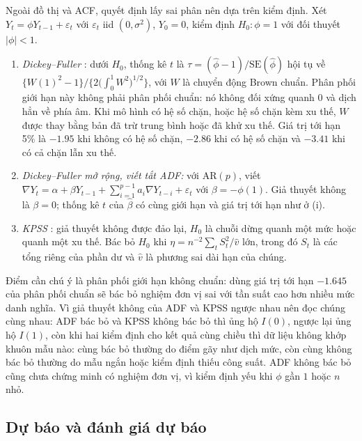 Ngoài đồ thị và ACF, quyết định lấy sai phân nên dựa trên kiểm định. Xét $Y_t=\phi Y_{t-1}+\varepsilon_t$ với $\varepsilon_t$ iid $(0,\sigma^2)$, $Y_0=0$, kiểm định $H_0:\phi=1$ với đối thuyết $|\phi|<1$.
\begin{kq}
\begin{enumerate}[label=(\roman*),leftmargin=*,itemsep=1pt]
\item \emph{Dickey--Fuller} : dưới $H_0$, thống kê $t$ là $\tau=(\hat\phi-1)/\mathrm{SE}(\hat\phi)$ hội tụ về $\bigl\{W(1)^2-1\bigr\}\big/\bigl\{2\bigl(\int_0^1W^2\bigr)^{1/2}\bigr\}$, với $W$ là chuyển động Brown chuẩn. Phân phối giới hạn này không phải phân phối chuẩn: nó không đối xứng quanh $0$ và dịch hẳn về phía âm. Khi mô hình có hệ số chặn, hoặc hệ số chặn kèm xu thế, $W$ được thay bằng bản đã trừ trung bình hoặc đã khử xu thế. Giá trị tới hạn 5\% là $-1.95$ khi không có hệ số chặn, $-2.86$ khi có hệ số chặn và $-3.41$ khi có cả chặn lẫn xu thế.
\item \emph{Dickey--Fuller mở rộng, viết tắt ADF:} với AR$(p)$, viết $\nabla Y_t=\alpha+\beta Y_{t-1}+\sum_{i=1}^{p-1}a_i\nabla Y_{t-i}+\varepsilon_t$ với $\beta=-\phi(1)$. Giả thuyết không là $\beta=0$; thống kê $t$ của $\hat\beta$ có cùng giới hạn và giá trị tới hạn như ở (i).
\item \emph{KPSS} : giả thuyết không được đảo lại, $H_0$ là chuỗi dừng quanh một mức hoặc quanh một xu thế. Bác bỏ $H_0$ khi $\eta=n^{-2}\sum_tS_t^2/\hat v$ lớn, trong đó $S_t$ là các tổng riêng của phần dư và $\hat v$ là phương sai dài hạn của chúng.
\end{enumerate}
\end{kq}
Điểm cần chú ý là phân phối giới hạn không chuẩn: dùng giá trị tới hạn $-1.645$ của phân phối chuẩn sẽ bác bỏ nghiệm đơn vị sai với tần suất cao hơn nhiều mức danh nghĩa. Vì giả thuyết không của ADF và KPSS ngược nhau nên đọc chúng cùng nhau: ADF bác bỏ và KPSS không bác bỏ thì ủng hộ $I(0)$, ngược lại ủng hộ $I(1)$, còn khi hai kiểm định cho kết quả cùng chiều thì dữ liệu không khớp khuôn mẫu nào: cùng bác bỏ thường do điểm gãy như dịch mức, còn cùng không bác bỏ thường do mẫu ngắn hoặc kiểm định thiếu công suất. ADF không bác bỏ cũng chưa chứng minh có nghiệm đơn vị, vì kiểm định yếu khi $\phi$ gần $1$ hoặc $n$ nhỏ.


\subsection{Dự báo và đánh giá dự báo}

